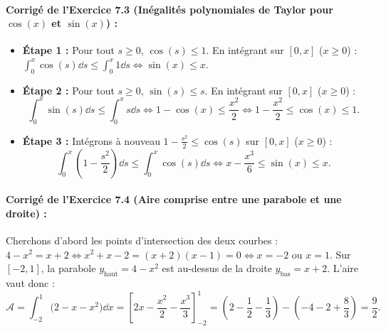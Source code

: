 \paragraph{Corrigé de l'Exercice 7.3 (Inégalités polynomiales de Taylor pour $\cos(x)$ et $\sin(x)$) :}
\begin{itemize}
    \item \textbf{Étape 1 :} Pour tout $s \ge 0$, $\cos(s) \le 1$. En intégrant sur $[0, x]$ ($x \ge 0$) : $\int_0^x \cos(s)\dd s \le \int_0^x 1\dd s \iff \boxed{\sin(x) \le x}$.
    \item \textbf{Étape 2 :} Pour tout $s \ge 0$, $\sin(s) \le s$. En intégrant sur $[0, x]$ ($x \ge 0$) :
    \[
        \int_0^x \sin(s)\dd s \le \int_0^x s\dd s \iff 1 - \cos(x) \le \frac{x^2}{2} \iff \boxed{1 - \frac{x^2}{2} \le \cos(x) \le 1}.
    \]
    \item \textbf{Étape 3 :} Intégrons à nouveau $1 - \frac{s^2}{2} \le \cos(s)$ sur $[0, x]$ ($x \ge 0$) :
    \[
        \int_0^x \left(1 - \frac{s^2}{2}\right)\dd s \le \int_0^x \cos(s)\dd s \iff \boxed{x - \frac{x^3}{6} \le \sin(x) \le x}.
    \]
\end{itemize}

\paragraph{Corrigé de l'Exercice 7.4 (Aire comprise entre une parabole et une droite) :}
Cherchons d'abord les points d'intersection des deux courbes : $4 - x^2 = x + 2 \iff x^2 + x - 2 = (x + 2)(x - 1) = 0 \iff x = -2$ ou $x = 1$. Sur $[-2, 1]$, la parabole $y_{\text{haut}} = 4 - x^2$ est au-dessus de la droite $y_{\text{bas}} = x + 2$. L'aire vaut donc :
\[
    \mathcal{A} = \int_{-2}^1 \bigl(2 - x - x^2\bigr)\dd x = \left[2x - \frac{x^2}{2} - \frac{x^3}{3}\right]_{-2}^1 = \left(2 - \frac{1}{2} - \frac{1}{3}\right) - \left(-4 - 2 + \frac{8}{3}\right) = \boxed{\frac{9}{2}}.
\]


